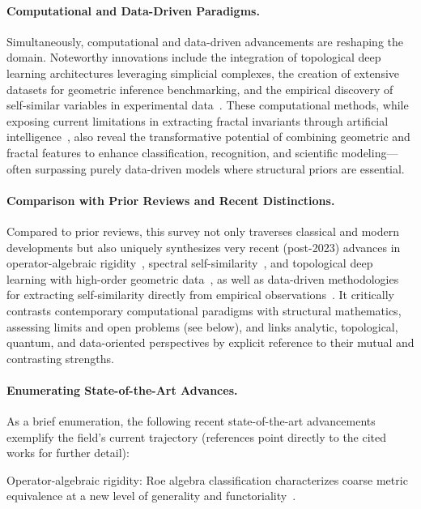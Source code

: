 \documentclass[sigconf]{acmart}
\begin{document}
\paragraph{Computational and Data-Driven Paradigms.}

Simultaneously, computational and data-driven advancements are reshaping the domain. Noteworthy innovations include the integration of topological deep learning architectures leveraging simplicial complexes, the creation of extensive datasets for geometric inference benchmarking, and the empirical discovery of self-similar variables in experimental data~\cite{ref60,ref101}. These computational methods, while exposing current limitations in extracting fractal invariants through artificial intelligence~\cite{ref44}, also reveal the transformative potential of combining geometric and fractal features to enhance classification, recognition, and scientific modeling---often surpassing purely data-driven models where structural priors are essential.

\paragraph{Comparison with Prior Reviews and Recent Distinctions.}

Compared to prior reviews, this survey not only traverses classical and modern developments but also uniquely synthesizes very recent (post-2023) advances in operator-algebraic rigidity~\cite{ref52}, spectral self-similarity~\cite{ref54}, and topological deep learning with high-order geometric data~\cite{ref26}, as well as data-driven methodologies for extracting self-similarity directly from empirical observations~\cite{ref65}. It critically contrasts contemporary computational paradigms with structural mathematics, assessing limits and open problems (see below), and links analytic, topological, quantum, and data-oriented perspectives by explicit reference to their mutual and contrasting strengths.

\paragraph{Enumerating State-of-the-Art Advances.}

As a brief enumeration, the following recent state-of-the-art advancements exemplify the field's current trajectory (references point directly to the cited works for further detail):

Operator-algebraic rigidity: Roe algebra classification characterizes coarse metric equivalence at a new level of generality and functoriality~\cite{ref52}.
\end{document}
